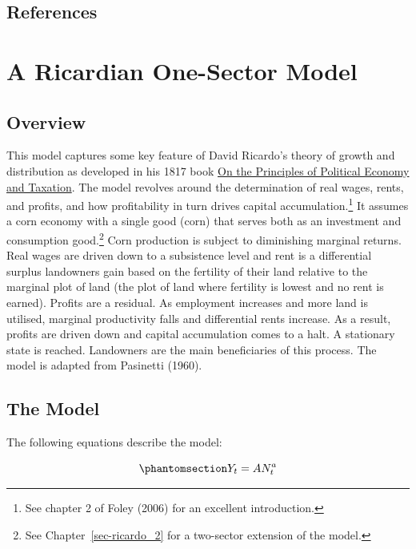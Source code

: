 \documentclass[
  letterpaper,
  DIV=11,
  numbers=noendperiod]{scrreprt}
\begin{document}
\section{References}\label{references-11}

\chapter{A Ricardian One-Sector Model}\label{sec-ricardo_1}

\section{Overview}\label{overview-10}

This model captures some key feature of David Ricardo's theory of growth
and distribution as developed in his 1817 book
\href{https://en.wikipedia.org/wiki/On_the_Principles_of_Political_Economy_and_Taxation}{On
the Principles of Political Economy and Taxation}. The model revolves
around the determination of real wages, rents, and profits, and how
profitability in turn drives capital accumulation.\footnote{See chapter
  2 of Foley (2006) for an excellent introduction.} It assumes a corn
economy with a single good (corn) that serves both as an investment and
consumption good.\footnote{See Chapter~\ref{sec-ricardo_2} for a
  two-sector extension of the model.} Corn production is subject to
diminishing marginal returns. Real wages are driven down to a
subsistence level and rent is a differential surplus landowners gain
based on the fertility of their land relative to the marginal plot of
land (the plot of land where fertility is lowest and no rent is earned).
Profits are a residual. As employment increases and more land is
utilised, marginal productivity falls and differential rents increase.
As a result, profits are driven down and capital accumulation comes to a
halt. A stationary state is reached. Landowners are the main
beneficiaries of this process. The model is adapted from Pasinetti
(1960).

\section{The Model}\label{the-model-10}

The following equations describe the model:

\begin{equation}\phantomsection\label{eq-ricardo1_Y}{
Y_t=AN_t^a
}\end{equation}
\end{document}
